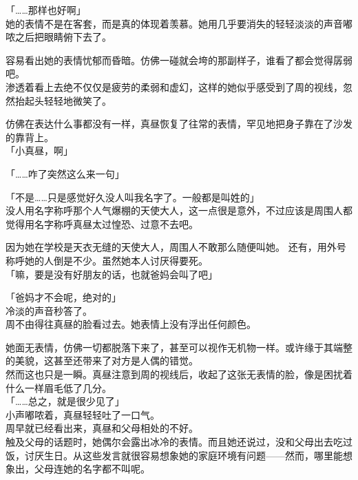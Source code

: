 「……那样也好啊」\\

她的表情不是在客套，而是真的体现着羡慕。她用几乎要消失的轻轻淡淡的声音嘟哝之后把眼睛俯下去了。

容易看出她的表情忧郁而昏暗。仿佛一碰就会垮的那副样子，谁看了都会觉得孱弱吧。\\

渗透着看上去绝不仅仅是疲劳的柔弱和虚幻，这样的她似乎感受到了周的视线，忽然抬起头轻轻地微笑了。

仿佛在表达什么事都没有一样，真昼恢复了往常的表情，罕见地把身子靠在了沙发的靠背上。\\

「小真昼，啊」

「……咋了突然这么来一句」

「不是……只是感觉好久没人叫我名字了。一般都是叫姓的」\\

没人用名字称呼那个人气爆棚的天使大人，这一点很是意外，不过应该是周围人都觉得用名字称呼真昼太过惶恐、过意不去吧。

因为她在学校是天衣无缝的天使大人，周围人不敢那么随便叫她。
还有，用外号称呼她的人倒是不少。虽然她本人讨厌得要死。\\

「嘛，要是没有好朋友的话，也就爸妈会叫了吧」

「爸妈才不会呢，绝对的」\\

冷淡的声音秒答了。\\

周不由得往真昼的脸看过去。她表情上没有浮出任何颜色。

她面无表情，仿佛一切都脱落下来了，甚至可以视作无机物一样。或许缘于其端整的美貌，这甚至还带来了对方是人偶的错觉。\\

然而这也只是一瞬。真昼注意到周的视线后，收起了这张无表情的脸，像是困扰着什么一样眉毛低了几分。\\

「……总之，就是很少见了」\\

小声嘟哝着，真昼轻轻吐了一口气。\\

周早就已经看出来，真昼和父母相处的不好。\\

触及父母的话题时，她偶尔会露出冰冷的表情。而且她还说过，没和父母出去吃过饭，讨厌生日。从这些发言就很容易想象她的家庭环境有问题——然而，哪里能想象出，父母连她的名字都不叫呢。\\


